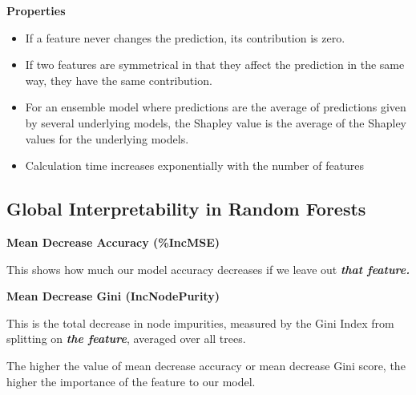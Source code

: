 \textbf{Properties}
\begin{itemize}
    \item If a feature never changes the prediction, its contribution is zero. 
    \item If two features are symmetrical in that they affect the prediction in the same way, they have the same contribution. 
    \item For an ensemble model where predictions are the average of predictions given by several underlying models, the Shapley value is the average of the Shapley values for the underlying models. 
    \item Calculation time increases exponentially with the number of features
\end{itemize}
\subsection{Global Interpretability in Random Forests}

\textbf{Mean Decrease Accuracy (\%IncMSE)}

This shows how much our model accuracy decreases if we leave out \textit{\textbf{that feature.}}

\textbf{Mean Decrease Gini (IncNodePurity)}

This is the total decrease in node impurities, measured by the Gini Index from splitting on \textit{\textbf{the feature}}, averaged over all trees.

The higher the value of mean decrease accuracy or mean decrease Gini score, the higher the importance of the feature to our model.
